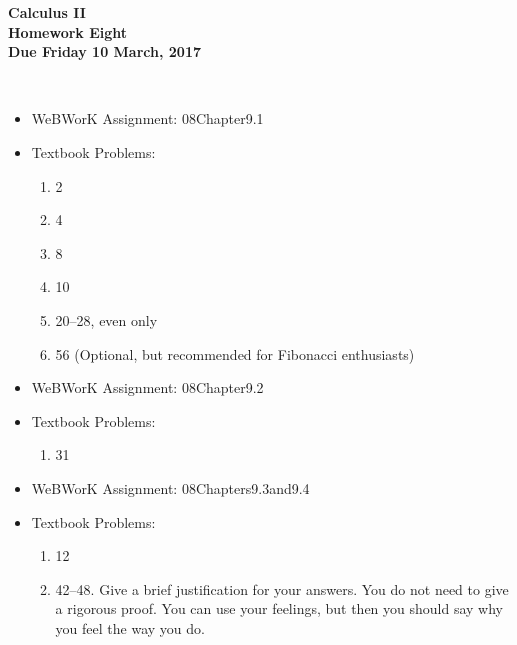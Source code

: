 \documentclass[12pt]{article}
\begin{document}
\pagestyle{empty}
 
\begin{center}
{\large {\bf Calculus II}}\\
\medskip
{\large {\bf Homework Eight}}\\
\medskip
{ {\bf Due Friday 10 March, 2017}}\\
\end{center}



 \\ 


\begin{itemize}
\setlength{\itemsep}{0mm}
\item WeBWorK Assignment: 08Chapter9.1
\item Textbook Problems:
  \begin{enumerate}
  \setlength{\itemsep}{-1mm}
    \item 2
    \item 4
    \item 8
    \item 10
    \item 20--28, even only
    \item 56 (Optional, but recommended for Fibonacci enthusiasts)
  \end{enumerate}
\end{itemize}

\begin{itemize}
\setlength{\itemsep}{0mm}
\item WeBWorK Assignment: 08Chapter9.2
\item Textbook Problems:
  \begin{enumerate}
  \setlength{\itemsep}{-1mm}
     \item 31
  \end{enumerate}
\end{itemize}


\begin{itemize}
\setlength{\itemsep}{0mm}
\item WeBWorK Assignment: 08Chapters9.3and9.4
\item Textbook Problems:
  \begin{enumerate}
  \setlength{\itemsep}{-1mm}
     \item 12
     \item 42--48. Give a brief justification for your answers.  You
       do not need to give a rigorous proof.  You can use your
       feelings, but then you should say why you feel the way you do. 
  \end{enumerate}
\end{itemize}
\end{document}
